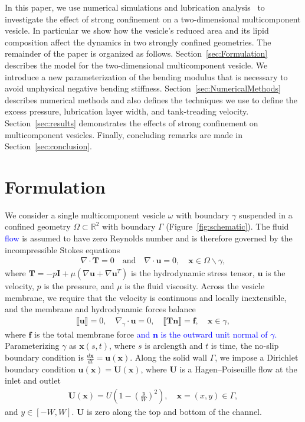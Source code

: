 \documentclass[twoside,twocolumn,9pt]{article}
\newcommand{\ff}{\mathbf{f}}
\newcommand{\nn}{\mathbf{n}}
\newcommand{\RR}{\mathbb{R}}
\newcommand{\uu}{\mathbf{u}}
\newcommand{\TT}{\mathbf{T}}
\newcommand{\UU}{\mathbf{U}}
\newcommand{\xx}{\mathbf{x}}
\begin{document}
In this paper, we use numerical simulations and lubrication
analysis~\cite{YoungStone2017_PRF,
mis-wis-ber-key-li-tun-law-per-erd-zha-zha-sun-kal-lam-kon2019} to
investigate the effect of strong confinement on a two-dimensional
multicomponent vesicle. In particular we show how the vesicle's reduced
area and its lipid composition affect the dynamics in two strongly
confined geometries.
%
The remainder of the paper is organized as follows.
Section~\ref{sec:Formulation} describes the model for the
two-dimensional multicomponent vesicle. We introduce a new
parameterization of the bending modulus that is necessary to avoid
unphysical negative bending stiffness.
Section~\ref{sec:NumericalMethods} describes numerical methods and also
defines the techniques we use to define the excess pressure, lubrication
layer width, and tank-treading velocity. Section~\ref{sec:results}
demonstrates the effects of strong confinement on multicomponent
vesicles. Finally, concluding remarks are made in
Section~\ref{sec:conclusion}.

\section{\label{sec:Formulation}Formulation}
We consider a single multicomponent vesicle $\omega$ with boundary
$\gamma$ suspended in a confined geometry $\Omega \subset \RR ^2$ with
boundary $\Gamma$ (Figure~\ref{fig:schematic}). The fluid 
\textcolor{blue}{
flow
}
is assumed to have zero Reynolds number and is therefore governed by the
incompressible Stokes equations
\begin{align}
  \nabla \cdot \TT = 0 \quad \text{and} \quad \nabla \cdot \uu = 0, 
    \quad \xx \in \Omega \backslash \gamma,
\end{align}
where $\TT = -p\mathbf{I} + \mu\left(\nabla \uu + \nabla \uu^T \right)$
is the hydrodynamic stress tensor, $\uu$ is the velocity, $p$ is the
pressure, and $\mu$ is the fluid viscosity. Across the vesicle membrane,
we require that the velocity is continuous and locally inextensible, and
the membrane and hydrodynamic forces balance
\begin{align}
  \llbracket \uu \rrbracket = 0, \quad 
  \nabla_{\gamma} \cdot \uu = 0, \quad
  \llbracket \TT\nn \rrbracket = \ff, \quad \xx \in \gamma,
\end{align}
where $\ff$ is the total membrane force 
\textcolor{blue}{
and $\nn$ is the outward unit normal of $\gamma$.} 
Parameterizing $\gamma$ as $\xx(s,t)$, where $s$ is arclength and $t$ is
time, the no-slip boundary condition is $\frac{d\xx}{dt} = \uu(\xx)$.
Along the solid wall $\Gamma$, we impose a Dirichlet boundary condition
$\uu(\xx) = \UU(\xx)$, where $\UU$ is a Hagen–Poiseuille flow at the
inlet and outlet
\begin{align}
  \UU(\xx) = U \left(1 - \left(\frac{y}{W}\right)^2 \right), 
    \quad \xx = (x,y) \in \Gamma,
  \label{eqn:dirBC}
\end{align}
and $y \in [-W,W]$. $\UU$ is zero along the top and bottom of the
channel.
\end{document}
